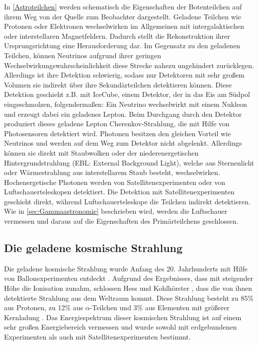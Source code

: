 In \autoref{Astroteilchen} werden schematisch die Eigenschaften der Botenteilchen auf ihrem Weg von der Quelle zum Beobachter dargestellt.
Geladene Teilchen wie Protonen oder Elektronen wechselwirken im Allgemeinen mit intergalaktischen oder interstellaren Magnetfeldern.
Dadurch stellt die Rekonstruktion ihrer Ursprungsrichtung eine Herausforderung dar.
Im Gegensatz zu den geladenen Teilchen, können Neutrinos aufgrund ihrer geringen Wechselwirkungswahrscheinlichkeit diese Strecke nahezu ungehindert zurücklegen. 
Allerdings ist ihre Detektion schwierig, sodass nur Detektoren mit sehr großem Volumen sie indirekt über ihre Sekundärteilchen detektieren können.
Diese Detektion geschieht z.B. mit IceCube, einem Detektor, der in das Eis am Südpol eingeschmolzen, folgendermaßen:
Ein Neutrino wechselwirkt mit einem Nukleon und erzeugt dabei ein geladenes Lepton. 
Beim Durchgang durch den Detektor produziert dieses geladene Lepton Cherenkov-Strahlung, die mit Hilfe von Photosensoren detektiert wird.
Photonen besitzen den gleichen Vorteil wie Neutrinos und werden auf dem Weg zum Detektor nicht abgelenkt.
Allerdings können sie direkt mit Staubwolken oder der niederenergetischen Hintergrundstrahlung (EBL: External Background Light), welche aus Sternenlicht oder Wärmestrahlung aus interstellarem Staub besteht, wechselwirken.
Hochenergetische Photonen werden von Satellitenexperimenten oder von Luftschauerteleskopen detektiert.
Die Detektion mit Satellitenexperimenten geschieht direkt, während Luftschauerteleskope die Teilchen indirekt detektieren.
Wie in \autoref{sec:Gammaastronomie} beschrieben wird, werden die Luftschauer vermessen und daraus auf die Eigenschaften des Primärteilchens geschlossen.


\subsection{Die geladene kosmische Strahlung}
Die geladene kosmische Strahlung wurde Anfang des 20. Jahrhunderts mit Hilfe von Ballonexperimenten entdeckt \cite{Hess}.
Aufgrund des Ergebnisses, dass mit steigender Höhe die Ionisation zunahm, schlossen Hess und Kohlhörster \cite{Kohlhoerster}, dass die von ihnen detektierte Strahlung aus dem Weltraum kommt.
Diese Strahlung besteht zu 85\% aus Protonen, zu 12\% aus $\alpha$-Teilchen und 3\% aus Elementen mit größerer Kernladung \cite{Grupen}.
Das Energiespektrum dieser kosmischen Strahlung ist auf einem sehr großen Energiebereich vermessen und wurde sowohl mit erdgebundenen Experimenten als auch mit Satellitenexperimenten bestimmt.


